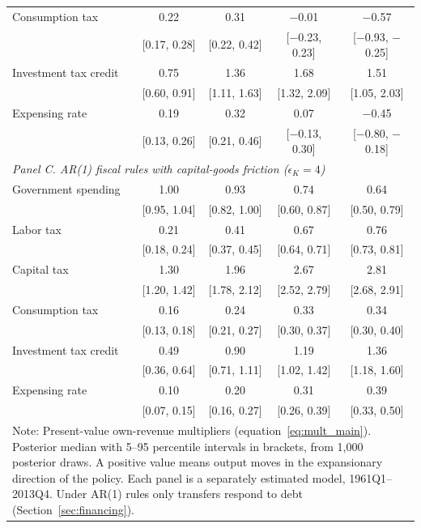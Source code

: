 \begin{table}[ht]
\begin{tabular}{lcccc}
Consumption tax          & 0.22 & 0.31 & $-$0.01 & $-$0.57 \\
                         & [0.17, 0.28] & [0.22, 0.42] & [$-$0.23, 0.23] & [$-$0.93, $-$0.25] \\
Investment tax credit    & 0.75 & 1.36 & 1.68 & 1.51 \\
                         & [0.60, 0.91] & [1.11, 1.63] & [1.32, 2.09] & [1.05, 2.03] \\
Expensing rate           & 0.19 & 0.32 & 0.07 & $-$0.45 \\
                         & [0.13, 0.26] & [0.21, 0.46] & [$-$0.13, 0.30] & [$-$0.80, $-$0.18] \\
\hline
\multicolumn{5}{l}{\textit{Panel C. AR(1) fiscal rules with capital-goods friction ($\epsilon_K = 4$)}} \\
Government spending      & 1.00 & 0.93 & 0.74 & 0.64 \\
                         & [0.95, 1.04] & [0.82, 1.00] & [0.60, 0.87] & [0.50, 0.79] \\
Labor tax                & 0.21 & 0.41 & 0.67 & 0.76 \\
                         & [0.18, 0.24] & [0.37, 0.45] & [0.64, 0.71] & [0.73, 0.81] \\
Capital tax              & 1.30 & 1.96 & 2.67 & 2.81 \\
                         & [1.20, 1.42] & [1.78, 2.12] & [2.52, 2.79] & [2.68, 2.91] \\
Consumption tax          & 0.16 & 0.24 & 0.33 & 0.34 \\
                         & [0.13, 0.18] & [0.21, 0.27] & [0.30, 0.37] & [0.30, 0.40] \\
Investment tax credit    & 0.49 & 0.90 & 1.19 & 1.36 \\
                         & [0.36, 0.64] & [0.71, 1.11] & [1.02, 1.42] & [1.18, 1.60] \\
Expensing rate           & 0.10 & 0.20 & 0.31 & 0.39 \\
                         & [0.07, 0.15] & [0.16, 0.27] & [0.26, 0.39] & [0.33, 0.50] \\
\hline\hline
\multicolumn{5}{p{0.85\textwidth}}{\footnotesize Note: Present-value own-revenue multipliers (equation~\ref{eq:mult_main}). Posterior median with 5--95 percentile intervals in brackets, from 1{,}000 posterior draws. A positive value means output moves in the expansionary direction of the policy. Each panel is a separately estimated model, 1961Q1--2013Q4. Under AR(1) rules only transfers respond to debt (Section~\ref{sec:financing}).}
\end{tabular}
\end{table}
